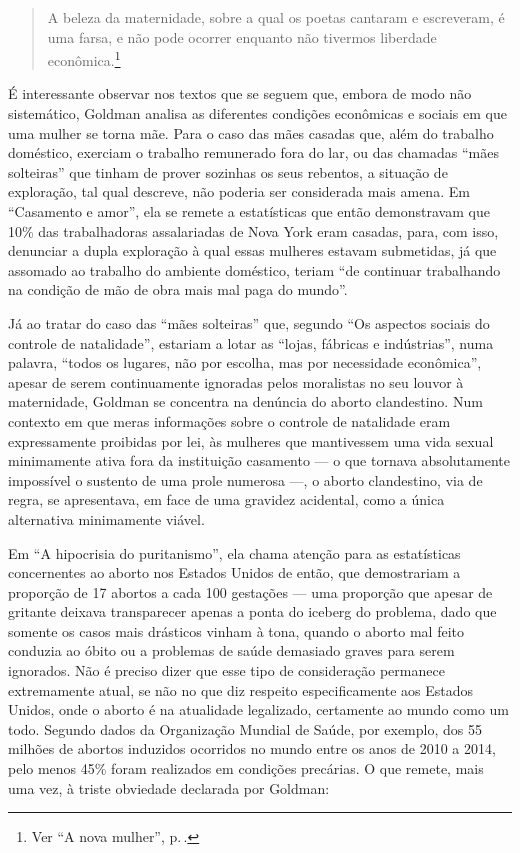 \begin{quote}
A beleza da maternidade, sobre a qual os poetas cantaram
e escreveram, é uma farsa, e não pode ocorrer enquanto não tivermos
liberdade econômica.\footnote{Ver ``A nova mulher'', p.\,\pageref{maternidade}.}
\end{quote}

É interessante observar nos textos que se seguem que, embora de modo não
sistemático, Goldman analisa as diferentes condições econômicas e
sociais em que uma mulher se torna mãe. Para o caso das mães casadas
que, além do trabalho doméstico, exerciam o trabalho remunerado fora do
lar, ou das chamadas ``mães solteiras'' que tinham de prover sozinhas os
seus rebentos, a situação de exploração, tal qual descreve, não poderia
ser considerada mais amena. Em ``Casamento e amor'', ela se remete a
estatísticas que então demonstravam que 10\% das trabalhadoras
assalariadas de Nova York eram casadas, para, com isso, denunciar a
dupla exploração à qual essas mulheres estavam submetidas, já que
assomado ao trabalho do ambiente doméstico, teriam ``de continuar
trabalhando na condição de mão de obra mais mal paga do mundo''.

Já ao
tratar do caso das ``mães solteiras'' que, segundo ``Os aspectos sociais
do controle de natalidade'', estariam a lotar as ``lojas, fábricas e
indústrias'', numa palavra, ``todos os lugares, não por escolha, mas por
necessidade econômica'', apesar de serem continuamente ignoradas pelos
moralistas no seu louvor à maternidade, Goldman se concentra na denúncia
do aborto clandestino. Num contexto em que meras informações sobre o
controle de natalidade eram expressamente proibidas por lei, às mulheres
que mantivessem uma vida sexual minimamente ativa fora da instituição
casamento --- o que tornava absolutamente impossível o sustento de uma
prole numerosa ---, o aborto clandestino, via de regra, se apresentava,
em face de uma gravidez acidental, como a única alternativa minimamente
viável.

Em ``A hipocrisia do puritanismo'', ela chama atenção para as
estatísticas concernentes ao aborto nos Estados Unidos de então, que
demostrariam a proporção de 17 abortos a cada 100 gestações --- uma
proporção que apesar de gritante deixava transparecer apenas a ponta do
iceberg do problema, dado que somente os casos mais drásticos vinham à
tona, quando o aborto mal feito conduzia ao óbito ou a problemas de
saúde demasiado graves para serem ignorados. Não é preciso dizer que
esse tipo de consideração permanece extremamente atual, se não no que
diz respeito especificamente aos Estados Unidos, onde o aborto é na
atualidade legalizado, certamente ao mundo como um todo. Segundo dados
da Organização Mundial de Saúde, por exemplo, dos 55 milhões de abortos
induzidos ocorridos no mundo entre os anos de 2010 a 2014, pelo menos
45\% foram realizados em condições precárias. O que remete, mais uma
vez, à triste obviedade declarada por Goldman:


